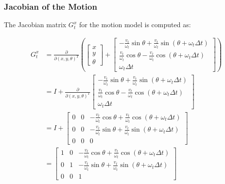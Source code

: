 \begin{frame}
    \frametitle{Jacobian of the Motion}
    
    The Jacobian matrix \( G_t^x \) for the motion model is computed as:
    
    \begin{align*}
        G_t^x &= \frac{\partial}{\partial(x, y, \theta)^T} \left(
        \begin{bmatrix}
        x \\
        y \\
        \theta
        \end{bmatrix}
        +
        \begin{bmatrix}
        -\frac{v_t}{\omega_t} \sin \theta + \frac{v_t}{\omega_t} \sin(\theta + \omega_t \Delta t) \\
        \frac{v_t}{\omega_t} \cos \theta - \frac{v_t}{\omega_t} \cos(\theta + \omega_t \Delta t) \\
        \omega_t \Delta t
        \end{bmatrix}
        \right) \\
        &= I + \frac{\partial}{\partial(x, y, \theta)^T} 
        \begin{bmatrix}
        -\frac{v_t}{\omega_t} \sin \theta + \frac{v_t}{\omega_t} \sin(\theta + \omega_t \Delta t) \\
        \frac{v_t}{\omega_t} \cos \theta - \frac{v_t}{\omega_t} \cos(\theta + \omega_t \Delta t) \\
        \omega_t \Delta t
        \end{bmatrix} \\
        &= I + 
        \begin{bmatrix}
        0 & 0 & -\frac{v_t}{\omega_t} \cos \theta + \frac{v_t}{\omega_t} \cos(\theta + \omega_t \Delta t) \\
        0 & 0 & -\frac{v_t}{\omega_t} \sin \theta + \frac{v_t}{\omega_t} \sin(\theta + \omega_t \Delta t) \\
        0 & 0 & 0
        \end{bmatrix} \\
        &= 
        \begin{bmatrix}
        1 & 0 & -\frac{v_t}{\omega_t} \cos \theta + \frac{v_t}{\omega_t} \cos(\theta + \omega_t \Delta t) \\
        0 & 1 & -\frac{v_t}{\omega_t} \sin \theta + \frac{v_t}{\omega_t} \sin(\theta + \omega_t \Delta t) \\
        0 & 0 & 1
        \end{bmatrix}
    \end{align*}
    
\end{frame}

